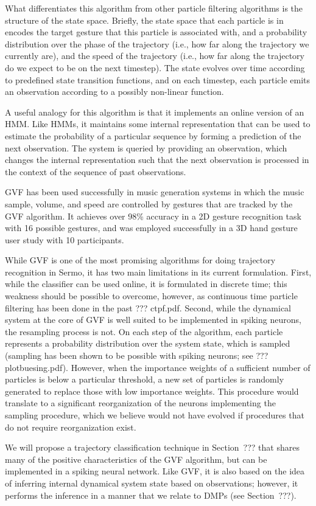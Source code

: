 What differentiates this algorithm from
other particle filtering algorithms
is the structure of the state space.
Briefly, the state space that each particle is in
encodes the target gesture that this particle
is associated with,
and a probability distribution
over the phase of the trajectory
(i.e., how far along the trajectory
we currently are),
and the speed of the trajectory
(i.e., how far along the trajectory
do we expect to be on the next timestep).
The state evolves over time according to
predefined state transition functions,
and on each timestep,
each particle emits an observation
according to a possibly non-linear function.

A useful analogy for this algorithm
is that it implements an online version of an HMM.
Like HMMs, it maintains some internal representation
that can be used to estimate the probability
of a particular sequence
by forming a prediction
of the next observation.
The system is queried by providing
an observation,
which changes the internal representation
such that the next observation
is processed in the context of
the sequence of past observations.

GVF has been used successfully
in music generation systems
in which the music sample,
volume, and speed are
controlled by gestures
that are tracked by the GVF algorithm.
It achieves over 98\% accuracy
in a 2D gesture recognition task
with 16 possible gestures,
and was employed successfully
in a 3D hand gesture user study
with 10 participants.

While GVF is one of the most promising
algorithms for doing trajectory recognition
in Sermo,
it has two main limitations in its current formulation.
First, while the classifier can be used online,
it is formulated in discrete time;
this weakness should be possible to overcome,
however, as continuous time particle filtering
has been done in the past
??? ctpf.pdf.
Second, while the dynamical system
at the core of GVF is well suited
to be implemented in spiking neurons,
the resampling process is not.
On each step of the algorithm,
each particle represents a probability
distribution over the system state,
which is sampled
(sampling has been shown to be
possible with spiking neurons;
see ??? plotbuesing.pdf).
However, when the importance weights
of a sufficient number of particles
is below a particular threshold,
a new set of particles
is randomly generated
to replace those with low importance weights.
This procedure would translate to
a significant reorganization
of the neurons implementing
the sampling procedure,
which we believe
would not have evolved if
procedures that do not require
reorganization exist.

We will propose a trajectory classification technique
in Section~??? that shares many of the positive
characteristics of the GVF algorithm,
but can be implemented in a spiking neural network.
Like GVF, it is also based on the idea
of inferring internal dynamical system state
based on observations;
however, it performs the inference
in a manner that we relate to
DMPs (see Section~???).
